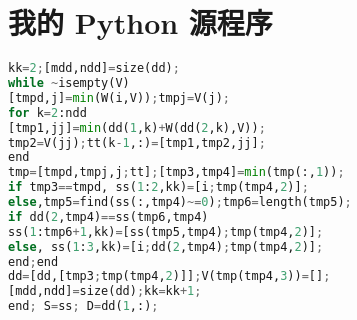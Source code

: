 \documentclass[bwprint]{gmcmthesis}
\begin{document}
\newpage
\appendix
\section{我的 Python 源程序}
\begin{lstlisting}[language=Python]%设置不同语言即可。
kk=2;[mdd,ndd]=size(dd);
while ~isempty(V)
[tmpd,j]=min(W(i,V));tmpj=V(j);
for k=2:ndd
[tmp1,jj]=min(dd(1,k)+W(dd(2,k),V));
tmp2=V(jj);tt(k-1,:)=[tmp1,tmp2,jj];
end
tmp=[tmpd,tmpj,j;tt];[tmp3,tmp4]=min(tmp(:,1));
if tmp3==tmpd, ss(1:2,kk)=[i;tmp(tmp4,2)];
else,tmp5=find(ss(:,tmp4)~=0);tmp6=length(tmp5);
if dd(2,tmp4)==ss(tmp6,tmp4)
ss(1:tmp6+1,kk)=[ss(tmp5,tmp4);tmp(tmp4,2)];
else, ss(1:3,kk)=[i;dd(2,tmp4);tmp(tmp4,2)];
end;end
dd=[dd,[tmp3;tmp(tmp4,2)]];V(tmp(tmp4,3))=[];
[mdd,ndd]=size(dd);kk=kk+1;
end; S=ss; D=dd(1,:);


 \end{lstlisting}
\end{document}
